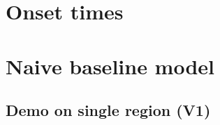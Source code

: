 \documentclass[
  10pt,
  letterpaper,
  DIV=11,
  numbers=noendperiod]{scrartcl}
\begin{document}
\section{Onset times}\label{onset-times}

\section{Naive baseline model}\label{naive-baseline-model}

\subsection{Demo on single region (V1)}\label{demo-on-single-region-v1}
\end{document}
